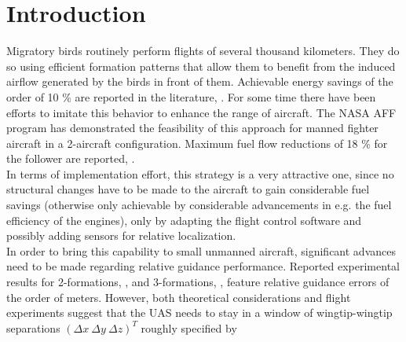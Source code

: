 \documentclass{ifacconf}
\begin{document}
\section{Introduction}
Migratory birds routinely perform flights of several thousand kilometers. They do so using efficient formation patterns that allow them to benefit from the induced airflow generated by the birds in front of them. Achievable energy savings of the order of 10 \% are reported in the literature, \cite{Weimerskirch2001}. For some time there have been efforts to imitate this behavior to enhance the range of aircraft. The NASA AFF program has demonstrated the feasibility of this approach for manned fighter aircraft in a 2-aircraft configuration. Maximum fuel flow reductions of 18 \% for the follower are reported, \cite{jake2003f}. \\
In terms of implementation effort, this strategy is a very attractive one, since no structural changes have to be made to the aircraft to gain considerable fuel savings (otherwise only achievable by considerable advancements in e.g. the fuel efficiency of the engines), only by adapting the flight control software and possibly adding sensors for relative localization. \\
In order to bring this capability to small unmanned aircraft, significant advances need to be made regarding relative guidance performance. Reported experimental results for 2-formations, \cite{Park2004}, and 3-formations, \cite{gu2006design}, feature relative guidance errors of the order of meters. However, both theoretical considerations \cite{Hummel1982} and flight experiments \cite{jake2003f} suggest that the UAS needs to stay in a window of wingtip-wingtip separations $(\Delta x \: \Delta y \: \Delta z)^T$ roughly specified by
\end{document}
